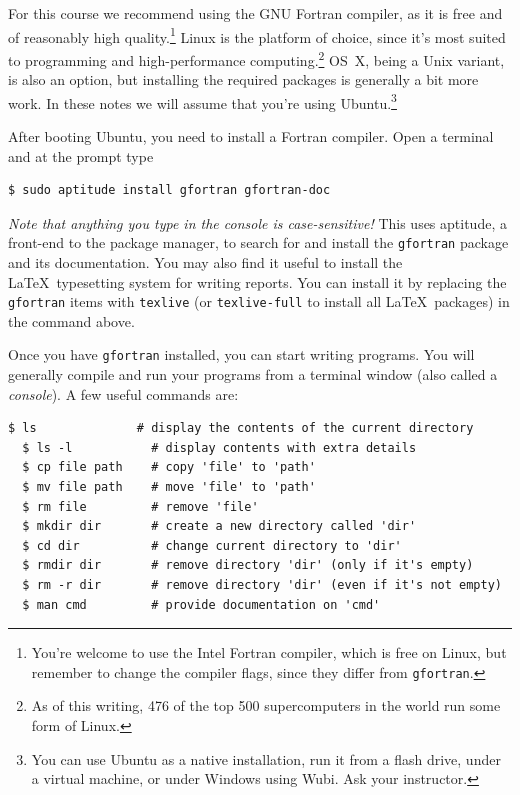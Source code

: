 \documentclass[openany,oneside]{report}
\begin{document}
For this course we recommend using the GNU Fortran compiler, as it is free and of reasonably high quality.\footnote{You're welcome to use the Intel Fortran compiler, which is free on Linux, but remember to change the compiler flags, since they differ from \texttt{gfortran}.} 
Linux is the platform of choice, since it's most suited to programming and high-performance computing.\footnote{As of this writing, 476 of the top 500 supercomputers in the world run some form of Linux.}
OS~X, being a Unix variant, is also an option, but installing the required packages is generally a bit more work.
In these notes we will assume that you're using Ubuntu.\footnote{You can use Ubuntu as a native installation, run it from a flash drive, under a virtual machine, or under Windows using Wubi.
Ask your instructor.}

After booting Ubuntu, you need to install a Fortran compiler.
Open a terminal and at the prompt type
\begin{verbatim}
$ sudo aptitude install gfortran gfortran-doc
\end{verbatim}
\emph{Note that anything you type in the console is case-sensitive!} 
This uses aptitude, a front-end to the package manager, to search for and install the \texttt{gfortran} package and its documentation.
You may also find it useful to install the \LaTeX\ typesetting system for writing reports.
You can install it by replacing the \texttt{gfortran} items with 
\texttt{texlive} (or \texttt{texlive-full} to install all \LaTeX\ packages) in the command above.

Once you have \texttt{gfortran} installed, you can start writing programs.
You will generally compile and run your programs from a terminal window (also called a \emph{console}).
A few useful commands are:
\begin{lstlisting}[style=Bash, nolol]
  $ ls              # display the contents of the current directory
  $ ls -l           # display contents with extra details
  $ cp file path    # copy 'file' to 'path'
  $ mv file path    # move 'file' to 'path'
  $ rm file         # remove 'file'
  $ mkdir dir       # create a new directory called 'dir'
  $ cd dir          # change current directory to 'dir'
  $ rmdir dir       # remove directory 'dir' (only if it's empty)
  $ rm -r dir       # remove directory 'dir' (even if it's not empty)
  $ man cmd         # provide documentation on 'cmd'
\end{lstlisting}
\end{document}
